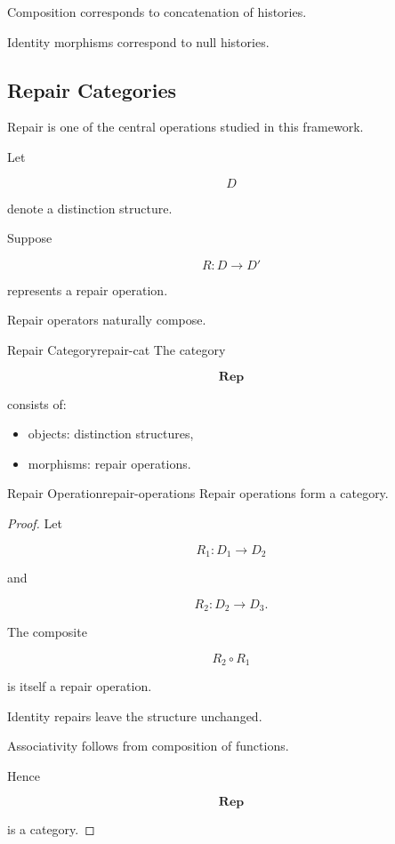 \documentclass[12pt,twoside,openright]{book}
\begin{document}
Composition corresponds to concatenation of histories.

Identity morphisms correspond to null histories.

\subsection{Repair Categories}

Repair is one of the central operations studied in this
framework.

Let

\[
D
\]

denote a distinction structure.

Suppose

\[
R:D\rightarrow D'
\]

represents a repair operation.

Repair operators naturally compose.

\begin{definition}{Repair Category}{repair-cat}
The category

\[
\mathbf{Rep}
\]

consists of:

\begin{itemize}
\item objects: distinction structures,
\item morphisms: repair operations.
\end{itemize}
\end{definition}

\begin{proposition}{Repair Operation}{repair-operations}
Repair operations form a category.
\end{proposition}

\begin{proof}
Let

\[
R_1:D_1\rightarrow D_2
\]

and

\[
R_2:D_2\rightarrow D_3.
\]

The composite

\[
R_2\circ R_1
\]

is itself a repair operation.

Identity repairs leave the structure unchanged.

Associativity follows from composition of functions.

Hence

\[
\mathbf{Rep}
\]

is a category.
\end{proof}
\end{document}

